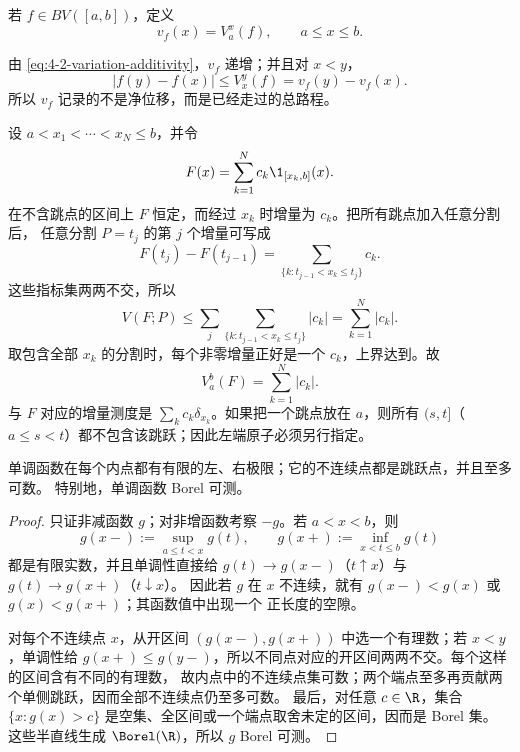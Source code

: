 \begin{definition}[变差函数]\label{def:4-2-1-2}
若 $f\in BV([a,b])$，定义
\[
 v_f(x)=V_a^x(f),\qquad a\le x\le b.
\]
\end{definition}

由 \eqref{eq:4-2-variation-additivity}，$v_f$ 递增；并且对 $x<y$，
\begin{equation}\label{eq:4-2-increment-dominated}
 |f(y)-f(x)|\le V_x^y(f)=v_f(y)-v_f(x).
\end{equation}
所以 $v_f$ 记录的不是净位移，而是已经走过的总路程。

\begin{example}[阶梯函数]\label{ex:4-2-1-1}
设 $a<x_1<\cdots <x_N\le b$，并令
\[
 F(x)=\sum_{k=1}^N c_k\1_{[x_k,b]}(x).
\]
在不含跳点的区间上 $F$ 恒定，而经过 $x_k$ 时增量为 $c_k$。把所有跳点加入任意分割后，
任意分割 $P={t_j}$ 的第 $j$ 个增量可写成
\[
 F(t_j)-F(t_{j-1})
 =\sum_{\{k:t_{j-1}<x_k\le t_j\}}c_k.
\]
这些指标集两两不交，所以
\[
 V(F;P)
 \le\sum_j\sum_{\{k:t_{j-1}<x_k\le t_j\}}|c_k|
 =\sum_{k=1}^N|c_k|.
\]
取包含全部 $x_k$ 的分割时，每个非零增量正好是一个 $c_k$，上界达到。故
\[
 V_a^b(F)=\sum_{k=1}^N|c_k|.
\]
与 $F$ 对应的增量测度是 $\sum_kc_k\delta_{x_k}$。如果把一个跳点放在 $a$，则所有
$(s,t]$（$a\le s<t$）都不包含该跳跃；因此左端原子必须另行指定。
\end{example}

\begin{proposition}[单调函数的正则性]\label{proposition:4-2-1-1}
单调函数在每个内点都有有限的左、右极限；它的不连续点都是跳跃点，并且至多可数。
特别地，单调函数 Borel 可测。
\end{proposition}

\begin{proof}
只证非减函数 $g$；对非增函数考察 $-g$。若 $a<x<b$，则
\[
 g(x-):=\sup_{a\le t<x}g(t),\qquad
 g(x+):=\inf_{x<t\le b}g(t)
\]
都是有限实数，并且单调性直接给
$g(t)\to g(x-)$（$t\uparrow x$）与 $g(t)\to g(x+)$（$t\downarrow x$）。
因此若 $g$ 在 $x$ 不连续，就有 $g(x-)<g(x)$ 或 $g(x)<g(x+)$；其函数值中出现一个
正长度的空隙。

对每个不连续点 $x$，从开区间 $(g(x-),g(x+))$ 中选一个有理数；若 $x<y$，单调性给
$g(x+)\le g(y-)$，所以不同点对应的开区间两两不交。每个这样的区间含有不同的有理数，
故内点中的不连续点集可数；两个端点至多再贡献两个单侧跳跃，因而全部不连续点仍至多可数。
最后，对任意 $c\in\R$，集合
$\{x:g(x)>c\}$ 是空集、全区间或一个端点取舍未定的区间，因而是 Borel 集。
这些半直线生成 $\Borel(\R)$，所以 $g$ Borel 可测。
\end{proof}

